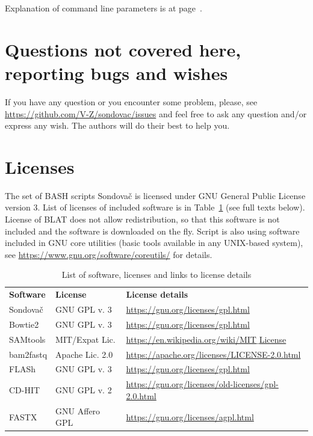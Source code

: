 \documentclass[a4paper, 11pt, twoside]{article}
\begin{document}
Explanation of command line parameters is at page~\pageref{script-usage}.

\section{Questions not covered here, reporting bugs and wishes}

If you have any question or you encounter some problem, please, see \href{https://github.com/V-Z/sondovac/issues}{https://github.com/V-Z/sondovac/issues} and feel free to ask any question and/or express any wish. The authors will do their best to help you.

\section{Licenses}

The set of BASH scripts Sondovač is licensed under GNU General Public License version 3. List of licenses of included software is in Table~\ref{software-lic} (see full texts below). License of BLAT does not allow redistribution, so that this software is not included and the software is downloaded on the fly. Script is also using software included in GNU core utilities (basic tools available in any UNIX-based system), see \href{https://www.gnu.org/software/coreutils/}{https://www.gnu.org/software/coreutils/} for details.

\begin{table}[htb]
\caption[List of software and licenses]{List of software, licenses and links to license details}
\begin{tabular}{lll}
\textbf{Software} & \textbf{License} & \textbf{License details}\\
Sondovač & GNU GPL v. 3 & \href{https://gnu.org/licenses/gpl.html}{https://gnu.org/licenses/gpl.html}\\
Bowtie2 & GNU GPL v. 3 & \href{https://gnu.org/licenses/gpl.html}{https://gnu.org/licenses/gpl.html}\\
SAMtools & MIT/Expat Lic. & \href{https://en.wikipedia.org/wiki/MIT_License}{https://en.wikipedia.org/wiki/MIT$\_$License}\\
bam2fastq & Apache Lic. 2.0 & \href{https://apache.org/licenses/LICENSE-2.0.html}{https://apache.org/licenses/LICENSE-2.0.html}\\
FLASh & GNU GPL v. 3 & \href{https://gnu.org/licenses/gpl.html}{https://gnu.org/licenses/gpl.html}\\
CD-HIT & GNU GPL v. 2 & \href{https://gnu.org/licenses/old-licenses/gpl-2.0.html}{https://gnu.org/licenses/old-licenses/gpl-2.0.html}\\
FASTX & GNU Affero GPL & \href{https://gnu.org/licenses/agpl.html}{https://gnu.org/licenses/agpl.html}
\end{tabular}
\label{software-lic}
\end{table}
\end{document}
